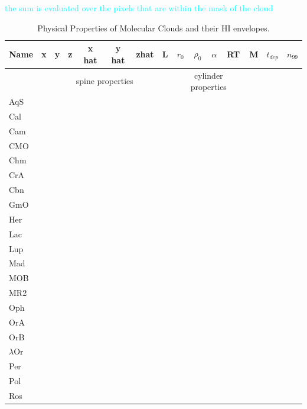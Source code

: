 \documentclass[twocolumn]{aastex631}
\begin{document}
{\textcolor{cyan}{the sum is evaluated over the pixels that are within the mask of the cloud }



\begin{table}\label{tab:m_r_omg_j}
\centering
 \caption{Physical Properties of Molecular Clouds and their HI envelopes.}

\begin{tabular}{|l|ccc|ccc|c||cccc||cc|c|} 

\hline
 Name&  x&  y&z&x hat& y hat& zhat&L& $r_0$& $\rho_0$&$\alpha$&RT&  M&$t_{dep}$& $n_{99}$\\
 \hline
 &  \multicolumn{7}{c||}{spine properties}&\multicolumn{4}{c||}{cylinder properties}& &&\\ 
 \hline
 \hline
 AqS&  &    && & & &&   && && && \\ 
 Cal&  &    && & & &&   && && && \\ 
 Cam&  &    && & & &&   && && && \\ 
 CMO&  &    && & & &&   && && && \\ 
 Chm&  &    && & & &&   && && && \\ 
 CrA& &   && & & &&   && && && \\ 
 Cbn& &   && & & &&   && && && \\ 
 GmO& &   && & & &&   && && && \\ 
 Her& &   && & & &&   && && && \\ 
 Lac& &   && & & &&   && && && \\ 
 Lup& &   && & & &&   && && && \\ 
 Mad& &   && & & &&   && && && \\ 
 MOB& &   && & & &&   && && && \\ 
 MR2& &   && & & &&   && && && \\ 
 Oph& &   && & & &&   && && && \\ 
 OrA& &   && & & &&   && && && \\ 
 OrB& &   && & & &&   && && && \\ 
 $\lambda$Or& &   && & & &&   && && && \\ 
 Per& &   && & & &&   && && && \\ 
 Pol& &   && & & &&   && && && \\ 
 Ros& &   && & & &&   && && && \\ 

\end{tabular}
\end{table}}
\end{document}

